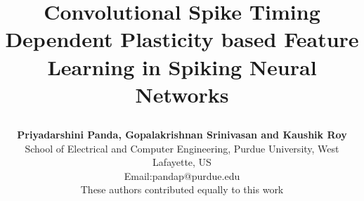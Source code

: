 \documentclass[journal, onecolumn]{IEEEtran}
\begin{document}
%
\title{
\begin{flushleft}
Convolutional Spike Timing Dependent Plasticity based Feature Learning in Spiking Neural Networks
\end{flushleft}
}

\author{\begin{flushleft}
\textbf{Priyadarshini Panda, Gopalakrishnan Srinivasan and Kaushik Roy}\\
School of Electrical and Computer Engineering, Purdue University, West Lafayette, US\\
Email:pandap@purdue.edu\\
These authors contributed equally to this work
\end{flushleft}

\vspace{-2.0ex}
}


% 
\end{document}
